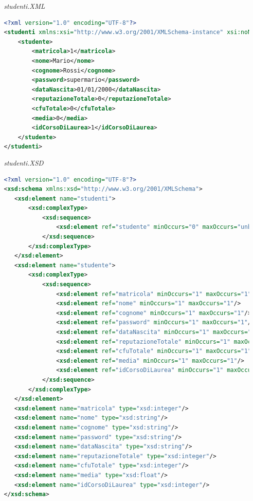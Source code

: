 \documentclass [a4paper,11pt]{book}
\begin{document}
\medskip

\emph{studenti.XML}

\label{sec:studenti}

\begin{lstlisting}[language=XML]
<?xml version="1.0" encoding="UTF-8"?>
<studenti xmlns:xsi="http://www.w3.org/2001/XMLSchema-instance" xsi:noNamespaceSchemaLocation="studenti.xsd">
    <studente>
        <matricola>1</matricola>
        <nome>Mario</nome>
        <cognome>Rossi</cognome>
        <password>supermario</password>
        <dataNascita>01/01/2000</dataNascita>
        <reputazioneTotale>0</reputazioneTotale>
        <cfuTotale>0</cfuTotale>
        <media>0</media>
        <idCorsoDiLaurea>1</idCorsoDiLaurea>
    </studente>
</studenti>
\end{lstlisting}

\emph{studenti.XSD}

\begin{lstlisting}[language=XML]
<?xml version="1.0" encoding="UTF-8"?>
<xsd:schema xmlns:xsd="http://www.w3.org/2001/XMLSchema">
   <xsd:element name="studenti">
       <xsd:complexType>
           <xsd:sequence>
               <xsd:element ref="studente" minOccurs="0" maxOccurs="unbounded" />
           </xsd:sequence>
       </xsd:complexType>
   </xsd:element>
   <xsd:element name="studente">
       <xsd:complexType>
           <xsd:sequence>
               <xsd:element ref="matricola" minOccurs="1" maxOccurs="1"/>
               <xsd:element ref="nome" minOccurs="1" maxOccurs="1"/>
               <xsd:element ref="cognome" minOccurs="1" maxOccurs="1"/>
               <xsd:element ref="password" minOccurs="1" maxOccurs="1"/>
               <xsd:element ref="dataNascita" minOccurs="1" maxOccurs="1"/>
               <xsd:element ref="reputazioneTotale" minOccurs="1" maxOccurs="1"/>
               <xsd:element ref="cfuTotale" minOccurs="1" maxOccurs="1"/>
               <xsd:element ref="media" minOccurs="1" maxOccurs="1"/>
               <xsd:element ref="idCorsoDiLaurea" minOccurs="1" maxOccurs="1"/>
           </xsd:sequence>
       </xsd:complexType>
   </xsd:element>
   <xsd:element name="matricola" type="xsd:integer"/>
   <xsd:element name="nome" type="xsd:string"/>
   <xsd:element name="cognome" type="xsd:string"/>
   <xsd:element name="password" type="xsd:string"/>
   <xsd:element name="dataNascita" type="xsd:string"/>
   <xsd:element name="reputazioneTotale" type="xsd:integer"/>
   <xsd:element name="cfuTotale" type="xsd:integer"/>
   <xsd:element name="media" type="xsd:float"/>
   <xsd:element name="idCorsoDiLaurea" type="xsd:integer"/>
</xsd:schema>
\end{lstlisting}
\end{document}
